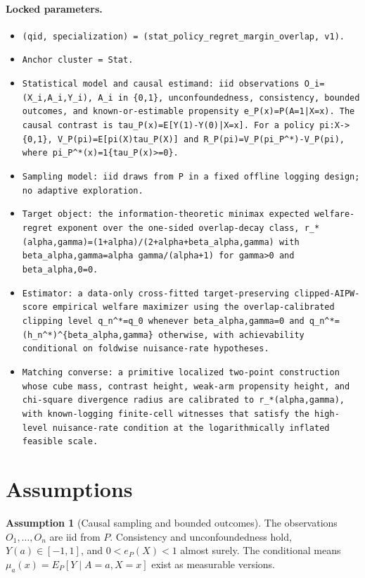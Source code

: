 \documentclass[11pt]{article}
\theoremstyle{definition}
\newtheorem{assumption}{Assumption}
\theoremstyle{plain}
\theoremstyle{remark}
\begin{document}
\paragraph{Locked parameters.}
\begin{itemize}[leftmargin=*]
  \item \texttt{(qid, specialization) = (stat\_policy\_regret\_margin\_overlap, v1).}
  \item \texttt{Anchor cluster = Stat.}
  \item \texttt{Statistical model and causal estimand: iid observations O\_i=(X\_i,A\_i,Y\_i), A\_i in \{0,1\}, unconfoundedness, consistency, bounded outcomes, and known-or-estimable propensity e\_P(x)=P(A=1|X=x). The causal contrast is tau\_P(x)=E[Y(1)-Y(0)|X=x]. For a policy pi:X->\{0,1\}, V\_P(pi)=E[pi(X)tau\_P(X)] and R\_P(pi)=V\_P(pi\_P\textasciicircum{}*)-V\_P(pi), where pi\_P\textasciicircum{}*(x)=1\{tau\_P(x)>=0\}.}
  \item \texttt{Sampling model: iid draws from P in a fixed offline logging design; no adaptive exploration.}
  \item \texttt{Target object: the information-theoretic minimax expected welfare-regret exponent over the one-sided overlap-decay class, r\_*(alpha,gamma)=(1+alpha)/(2+alpha+beta\_{alpha,gamma}) with beta\_{alpha,gamma}=alpha gamma/(alpha+1) for gamma>0 and beta\_{alpha,0}=0.}
  \item \texttt{Estimator: a data-only cross-fitted target-preserving clipped-AIPW-score empirical welfare maximizer using the overlap-calibrated clipping level q\_n\textasciicircum{}*=q\_0 whenever beta\_{alpha,gamma}=0 and q\_n\textasciicircum{}*=(h\_n\textasciicircum{}*)\textasciicircum{}\{beta\_{alpha,gamma}\} otherwise, with achievability conditional on foldwise nuisance-rate hypotheses.}
  \item \texttt{Matching converse: a primitive localized two-point construction whose cube mass, contrast height, weak-arm propensity height, and chi-square divergence radius are calibrated to r\_*(alpha,gamma), with known-logging finite-cell witnesses that satisfy the high-level nuisance-rate condition at the logarithmically inflated feasible scale.}
\end{itemize}

\section{Assumptions}
\begin{assumption}[Causal sampling and bounded outcomes]\label{ass:causal-sampling}
The observations \(O_1,\ldots,O_n\) are iid from \(P\).  Consistency and
unconfoundedness hold, \(Y(a)\in[-1,1]\), and \(0<e_P(X)<1\) almost surely.
The conditional means \(\mu_a(x)=E_P[Y\mid A=a,X=x]\) exist as measurable
versions.
\end{assumption}
\end{document}
